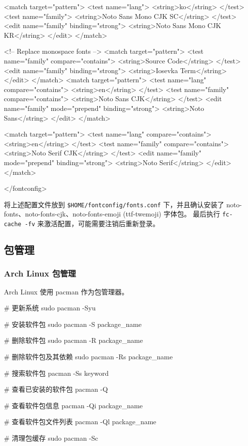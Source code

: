 \begin{lstcode}[numbers=none]
  <match target="pattern">
    <test name="lang">
      <string>ko</string>
    </test>
    <test name="family">
      <string>Noto Sans Mono CJK SC</string>
    </test>
    <edit name="family" binding="strong">
      <string>Noto Sans Mono CJK KR</string>
    </edit>
  </match>

  <!-- Replace monospace fonts -->
  <match target="pattern">
    <test name="family" compare="contains">
      <string>Source Code</string>
    </test>
    <edit name="family" binding="strong">
      <string>Iosevka Term</string>
    </edit>
  </match>
    <match target="pattern">
    <test name="lang" compare="contains">
      <string>en</string>
    </test>
    <test name="family" compare="contains">
      <string>Noto Sans CJK</string>
    </test>
    <edit name="family" mode="prepend" binding="strong">
      <string>Noto Sans</string>
    </edit>
  </match>

  <match target="pattern">
    <test name="lang" compare="contains">
      <string>en</string>
    </test>
    <test name="family" compare="contains">
      <string>Noto Serif CJK</string>
    </test>
    <edit name="family" mode="prepend" binding="strong">
      <string>Noto Serif</string>
    </edit>
  </match>

</fontconfig>
\end{lstcode}

将上述配置文件放到 \lstinline{$HOME/fontconfig/fonts.conf} 下，并且确认安装了 noto-fonts、noto-fonts-cjk、noto-fonts-emoji (ttf-twemoji) 字体包。
最后执行 \lstinline{fc-cache -fv} 来激活配置，可能需要注销后重新登录。

\subsection{包管理}

\subsubsection{Arch Linux 包管理}

Arch Linux 使用 pacman 作为包管理器。


\begin{lstcode}[numbers=none]
  # 更新系统
  sudo pacman -Syu

  # 安装软件包
  sudo pacman -S package_name

  # 删除软件包
  sudo pacman -R package_name

  # 删除软件包及其依赖
  sudo pacman -Rs package_name

  # 搜索软件包
  pacman -Ss keyword

  # 查看已安装的软件包
  pacman -Q

  # 查看软件包信息
  pacman -Qi package_name

  # 查看软件包文件列表
  pacman -Ql package_name

  # 清理包缓存
  sudo pacman -Sc
\end{lstcode}

